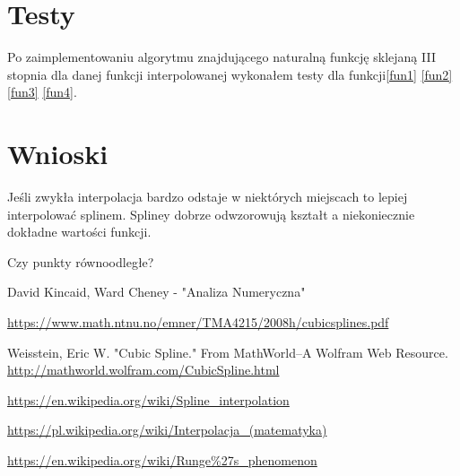\documentclass{article}
\begin{document}
\section{Testy}
Po zaimplementowaniu algorytmu znajdującego naturalną funkcję sklejaną III stopnia dla danej funkcji interpolowanej wykonałem testy dla funkcji\eqref{fun1} \eqref{fun2} \eqref{fun3} \eqref{fun4}.
	
	
\section{Wnioski}
Jeśli zwykła interpolacja bardzo odstaje w niektórych miejscach to lepiej interpolować splinem.
Spliney dobrze odwzorowują kształt a niekoniecznie dokładne wartości funkcji.

Czy punkty równoodległe?


\begin{thebibliography}{9}
	\itemsep2pt
			
	 David Kincaid, Ward Cheney - "Analiza Numeryczna"
	
	 \url{https://www.math.ntnu.no/emner/TMA4215/2008h/cubicsplines.pdf}
	
	 Weisstein, Eric W. "Cubic Spline." From MathWorld--A Wolfram Web Resource. \url{http://mathworld.wolfram.com/CubicSpline.html}
	
	 \url{https://en.wikipedia.org/wiki/Spline_interpolation}
	
	\url{https://pl.wikipedia.org/wiki/Interpolacja_(matematyka)}
	
	\url{https://en.wikipedia.org/wiki/Runge%27s_phenomenon}
	 
\end{thebibliography}
\end{document}
